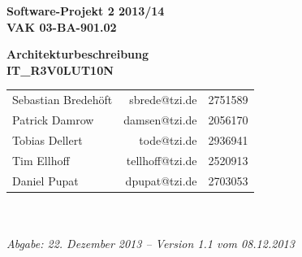 \documentclass[fontsize=12pt,paper=a4,twoside]{scrartcl}
\begin{document}
\thispagestyle{fancy} \fancyhead[LO,RE]{ }  \fancyfoot[C]{}

\vspace{3cm} 
\begin{minipage}
	[H]{ 
	\textwidth} 
	\begin{center}
		\bf \Large Software-Projekt 2 2013/14\\
		\smallskip \small VAK 03-BA-901.02\\
		\vspace{3cm} 
	\end{center}
\end{minipage}
\begin{minipage}
	[H]{ 
	\textwidth} 
	\begin{center}
		\vspace{1cm} \bf \Large Architekturbeschreibung\\
		\vspace{3ex} \small IT\_R3V0LUT10N\\
		\vfill 
	\end{center}
\end{minipage}
\vfill 
\begin{minipage}
	[H]{ 
	\textwidth} 
	\begin{center}
		\sf 
		\begin{tabular}
			{lrr} Sebastian Bredehöft & sbrede@tzi.de & 2751589\\
			Patrick Damrow & damsen@tzi.de & 2056170\\
			Tobias Dellert & tode@tzi.de & 2936941\\
			Tim Ellhoff & tellhoff@tzi.de & 2520913\\
			Daniel Pupat & dpupat@tzi.de & 2703053\\
		\end{tabular}
		\\
		~ \vspace{2cm} \\
		\it Abgabe: 22. Dezember 2013 -- Version 1.1 vom 08.12.2013 \\
		~ 
	\end{center}
\end{minipage}

\newpage

\thispagestyle{fancy} \fancyhead{}   \fancyfoot{} 
\renewcommand{\headrulewidth}{0.4pt} 
\tableofcontents
\newpage
\listoffigures
\end{document}
